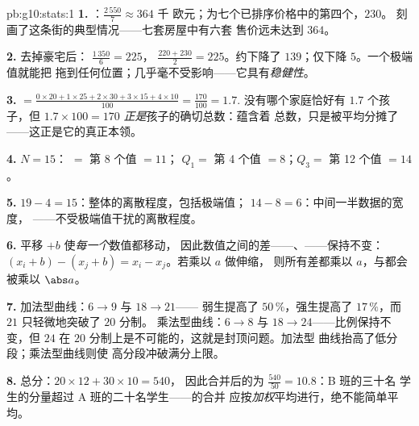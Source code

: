 \begin{solution}{pb:g10:stats:1}
\textbf{1.} ：$\frac{2\,550}{7} \approx 364$ 千
欧元；为七个已排序价格中的第四个，$230$。
刻画了这条街的典型情况——七套房屋中有六套
售价远未达到 $364$。

\textbf{2.} 去掉豪宅后： $\frac{1\,350}{6} = 225$，
 $\frac{220 + 230}{2} = 225$。约下降了
$139$；仅下降 $5$。一个极端值就能把
拖到任何位置；几乎毫不受影响——它具有\emph{稳健性}。

\textbf{3.}  $= \frac{0 \times 20 + 1 \times 25 + 2 \times
30 + 3 \times 15 + 4 \times 10}{100} = \frac{170}{100} = 1.7$.
没有哪个家庭恰好有 $1.7$ 个孩子，但 $1.7 \times 100 = 170$
\emph{正是}孩子的确切总数：蕴含着
总数，只是被平均分摊了——这正是它的真正本领。

\textbf{4.} $N = 15$： $=$ 第 8 个值 $= 11$；
$Q_1 =$ 第 4 个值 $= 8$；$Q_3 =$ 第 12 个值 $= 14$。

\textbf{5.}  $19 - 4 = 15$：整体的离散程度，包括极端值；
 $14 - 8 = 6$：中间一半数据的宽度，
——不受极端值干扰的离散程度。

\textbf{6.} 平移 $+b$ 使\emph{每一个}数值都移动，
因此数值之间的差——、——保持不变：
$(x_i + b) - (x_j + b) = x_i - x_j$。若乘以 $a$ 做伸缩，
则所有差都乘以 $a$，与都会被乘以
$\abs a$。

\textbf{7.} 加法型曲线：$6 \to 9$ 与 $18 \to 21$——
弱生提高了 $50\,\%$，强生提高了 $17\,\%$，而 $21$
只轻微地突破了 $20$ 分制。
乘法型曲线：$6 \to 8$ 与 $18 \to 24$——比例保持不变，但 $24$ 在
$20$ 分制上是不可能的，这就是封顶问题。加法型
曲线抬高了低分段；乘法型曲线则使
高分段冲破满分上限。

\textbf{8.} 总分：$20 \times 12 + 30 \times 10 = 540$，
因此合并后的为 $\frac{540}{50} = 10.8$：B 班的三十名
学生的分量超过 A 班的二十名学生——的合并
应按\emph{加权}平均进行，绝不能简单平均。


\end{solution}
